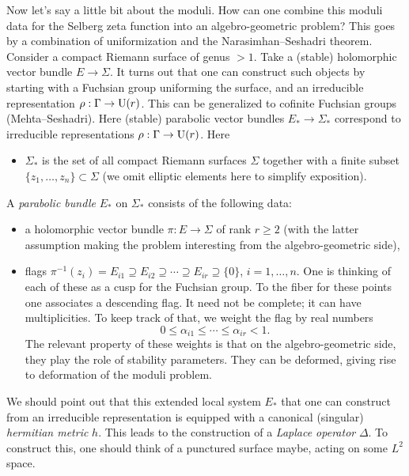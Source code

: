 \documentclass[reqno]{amsart} 
\numberwithin{theorem}{section}
\numberwithin{equation}{section}
\begin{document}
Now let's say a little bit about the moduli.  How can one combine this moduli data for the Selberg zeta function into an algebro-geometric problem?  This goes by a combination of uniformization and the Narasimhan--Seshadri theorem.  Consider a compact Riemann surface of genus $> 1$.  Take a (stable) holomorphic vector bundle $E \rightarrow \Sigma$.  It turns out that one can construct such objects by starting with a Fuchsian group uniforming the surface, and an irreducible representation $\rho : \Gamma \rightarrow \operatorname{U}(r) $.  This can be generalized to cofinite Fuchsian groups (Mehta--Seshadri).  Here (stable) parabolic vector bundles $E_\ast \rightarrow \Sigma_\ast$ correspond to irreducible representations $\rho : \Gamma \rightarrow \operatorname{U}(r)$.  Here
\begin{itemize}
\item $\Sigma_\ast$ is the set of all compact Riemann surfaces $\Sigma$ together with a finite subset $\{z_1, \dotsc, z_n\} \subset \Sigma$ (we omit elliptic elements here to simplify exposition).
\end{itemize}
A \emph{parabolic bundle} $E_\ast$ on $\Sigma_\ast$ consists of the following data:
\begin{itemize}
\item a holomorphic vector bundle $\pi : E \rightarrow \Sigma$ of rank $r \geq 2$ (with the latter assumption making the problem interesting from the algebro-geometric side),
\item flags $\pi^{- 1}(z_i) = E_{i 1} \supseteq E_{i 2} \supseteq \dotsb \supseteq E_{i r} \supseteq \{0\}$, $i = 1, \dotsc, n$.  One is thinking of each of these as a cusp for the Fuchsian group.  To the fiber for these points one associates a descending flag.  It need not be complete; it can have multiplicities.  To keep  track of that, we weight the flag by real numbers
  \begin{equation*}
    0 \leq \alpha_{i 1} \leq \dotsb \leq \alpha_{i r} < 1.
  \end{equation*}
  The relevant property of these weights is that on the algebro-geometric side, they play the role of stability parameters.  They can be deformed, giving rise to deformation of the moduli problem.
\end{itemize}
We should point out that this extended local system $E_\ast$ that one can construct from an irreducible representation is equipped with a canonical (singular) \emph{hermitian metric} $h$.  This leads to the construction of a \emph{Laplace operator} $\Delta$.  To construct this, one should think of a punctured surface maybe, acting on some $L^2$ space.
\end{document}
